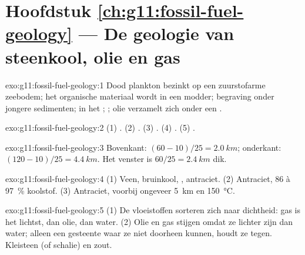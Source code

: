 \section*{Hoofdstuk \ref{ch:g11:fossil-fuel-geology} --- De geologie van steenkool, olie en gas}

\begin{solution}{exo:g11:fossil-fuel-geology:1}
Dood plankton bezinkt op een zuurstofarme zeebodem; het organische materiaal
wordt  in een modder; begraving onder jongere sedimenten;  in het
; ; olie verzamelt zich onder een .
\end{solution}

\begin{solution}{exo:g11:fossil-fuel-geology:2}
(1) . (2) . (3) . (4) . (5) .
\end{solution}

\begin{solution}{exo:g11:fossil-fuel-geology:3}
Bovenkant: $(60 - 10)/25 = \qty{2.0}{km}$; onderkant: $(120 - 10)/25 = \qty{4.4}{km}$.
Het venster is $60/25 = \qty{2.4}{km}$ dik.
\end{solution}

\begin{solution}{exo:g11:fossil-fuel-geology:4}
(1) Veen, bruinkool, , antraciet. (2) Antraciet, 86 à
\qty{97}{\percent} koolstof. (3) Antraciet, voorbij ongeveer \qty{5}{km} en
\qty{150}{\degreeCelsius}.
\end{solution}

\begin{solution}{exo:g11:fossil-fuel-geology:5}
(1) De vloeistoffen sorteren zich naar dichtheid: gas is het lichtst, dan olie,
dan water. (2) Olie en gas stijgen omdat ze lichter zijn dan water; alleen
een gesteente waar ze niet doorheen kunnen, houdt ze tegen. Kleisteen (of schalie) en zout.
\end{solution}

